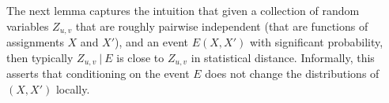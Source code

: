 \documentclass[11pt]{article}
\theoremstyle{definition}
\begin{document}

The next lemma captures the intuition that 
given a collection of random variables $Z_{u,v}$ that are roughly pairwise independent (that are functions of assignments $X$ and $X'$), and an event $E(X,X')$ with significant 
probability, then typically $Z_{u,v}~|~E$ 
is close to $Z_{u,v}$ in statistical distance. Informally, this asserts that 
conditioning on the event $E$ does not 
change the distributions of $(X, X')$ locally.
\end{document}
